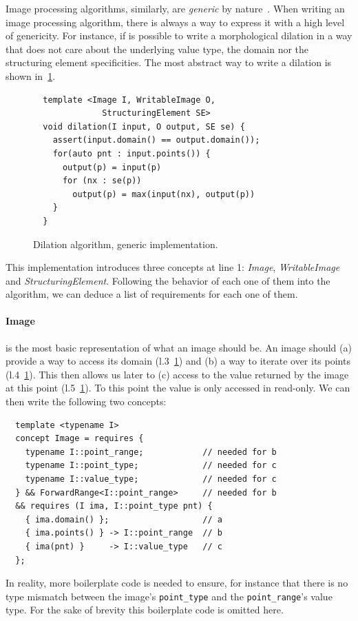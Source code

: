 Image processing algorithms, similarly, are \emph{generic} by
nature~\cite{ritter.1990.cvgi,geraud.2000.icpr,darbon.2002.ismm,levillain.2010.icip,levillain.2014.ciarp}. When writing
an image processing algorithm, there is always a way to express it with a high level of genericity. For instance, if is
possible to write a morphological dilation in a way that does not care about the underlying value type, the domain nor
the structuring element specificities. The most abstract way to write a dilation is shown in~\ref{fig.gen.dilate}.

\begin{figure}[tbh]
  \centering
  \begin{verbatim}
  template <Image I, WritableImage O,
              StructuringElement SE>
  void dilation(I input, O output, SE se) {
    assert(input.domain() == output.domain());
    for(auto pnt : input.points()) {
      output(p) = input(p)
      for (nx : se(p))
        output(p) = max(input(nx), output(p))
    }
  }
  \end{verbatim}
  \caption{Dilation algorithm, generic implementation.}
  \label{fig.gen.dilate}
\end{figure}

This implementation introduces three concepts at line 1: \emph{Image}, \emph{WritableImage} and
\emph{StructuringElement}. Following the behavior of each one of them into the algorithm, we can deduce a list of
requirements for each one of them.

\paragraph{Image} is the most basic representation of what an image should be. An image should (a) provide a way to
access its domain (l.3~\ref{fig.gen.dilate}) and (b) a way to iterate over its points (l.4~\ref{fig.gen.dilate}). This
then allows us later to (c) access to the value returned by the image at this point (l.5~\ref{fig.gen.dilate}). To this
point the value is only accessed in read-only. We can then write the following two concepts:
\begin{verbatim}
  template <typename I>
  concept Image = requires {
    typename I::point_range;            // needed for b
    typename I::point_type;             // needed for c
    typename I::value_type;             // needed for c
  } && ForwardRange<I::point_range>     // needed for b
  && requires (I ima, I::point_type pnt) {
    { ima.domain() };                   // a
    { ima.points() } -> I::point_range  // b
    { ima(pnt) }     -> I::value_type   // c
  };
\end{verbatim}
In reality, more boilerplate code is needed to ensure, for instance that there is no type mismatch between the image's
\texttt{point\_type} and the \texttt{point\_range}'s value type. For the sake of brevity this boilerplate code is
omitted here.

